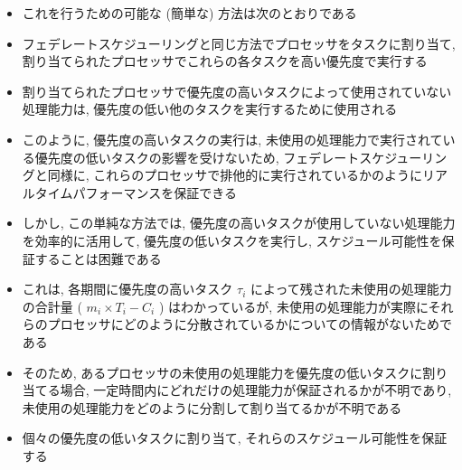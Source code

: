\begin{frame}{}
    \begin{itemize}
        \item これを行うための可能な (簡単な) 方法は次のとおりである
\item フェデレートスケジューリングと同じ方法でプロセッサをタスクに割り当て, 割り当てられたプロセッサでこれらの各タスクを高い優先度で実行する
\item 割り当てられたプロセッサで優先度の高いタスクによって使用されていない処理能力は, 優先度の低い他のタスクを実行するために使用される
\item このように, 優先度の高いタスクの実行は, 未使用の処理能力で実行されている優先度の低いタスクの影響を受けないため, フェデレートスケジューリングと同様に, これらのプロセッサで排他的に実行されているかのようにリアルタイムパフォーマンスを保証できる
    \end{itemize}
\end{frame}

\begin{frame}{}
    \begin{itemize}
        \item しかし, この単純な方法では, 優先度の高いタスクが使用していない処理能力を効率的に活用して, 優先度の低いタスクを実行し, スケジュール可能性を保証することは困難である
\item これは, 各期間に優先度の高いタスク $\tau_{i}$ によって残された未使用の処理能力の合計量 ( $m_{i} \times T_{i}-C_{i}$ ) はわかっているが, 未使用の処理能力が実際にそれらのプロセッサにどのように分散されているかについての情報がないためである
\item そのため, あるプロセッサの未使用の処理能力を優先度の低いタスクに割り当てる場合, 一定時間内にどれだけの処理能力が保証されるかが不明であり, 未使用の処理能力をどのように分割して割り当てるかが不明である
\item 個々の優先度の低いタスクに割り当て, それらのスケジュール可能性を保証する
    \end{itemize}
\end{frame}

